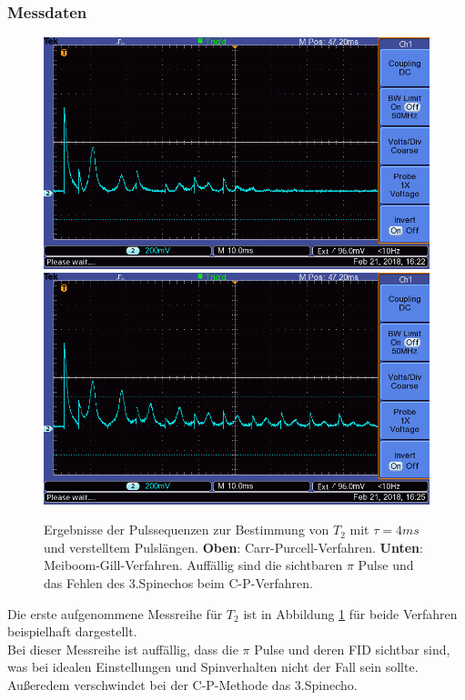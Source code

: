 \documentclass[12pt,a4paper]{article}
\begin{document}
\subsubsection{Messdaten}\label{sec:T2messdaten}
\begin{figure}
\centering
\includegraphics[scale=0.8]{Bilder/T2CP.png}
\includegraphics[scale=0.8]{Bilder/T2MG.png}
\caption{Ergebnisse der Pulssequenzen zur Bestimmung von $T_2$ mit $\tau = 4ms$ und verstelltem Pulslängen. \textbf{Oben}: Carr-Purcell-Verfahren. \textbf{Unten}: Meiboom-Gill-Verfahren. Auffällig sind die sichtbaren $\pi$ Pulse und das Fehlen des 3.Spinechos beim C-P-Verfahren.}
\label{fig:T2Daten}
\end{figure}

Die erste aufgenommene Messreihe für $T_2$ ist in Abbildung \ref{fig:T2Daten} für beide Verfahren beispielhaft dargestellt.\\
Bei dieser Messreihe ist auffällig, dass die $\pi$ Pulse und deren FID sichtbar sind, was bei idealen Einstellungen und Spinverhalten nicht der Fall sein sollte. Außeredem verschwindet bei der C-P-Methode das 3.Spinecho.
\end{document}
